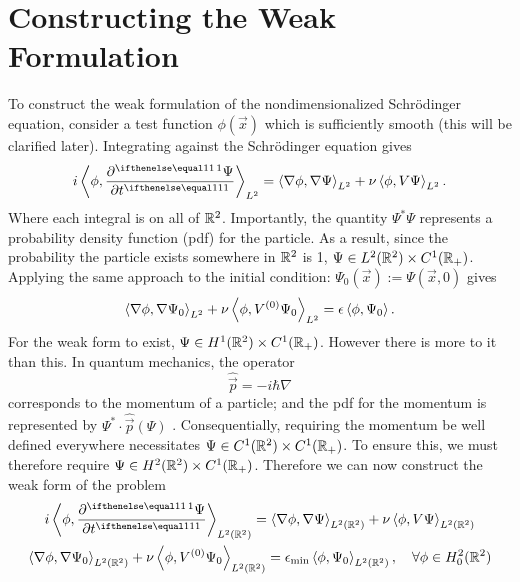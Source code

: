 \documentclass[../../main.tex]{subfiles}
\begin{document}
\section{Constructing the Weak Formulation}

To construct the weak formulation of the nondimensionalized 
Schr\"odinger equation, consider a test function 
$\phi(\vec x)$ which is sufficiently smooth
(this will be clarified later). 
Integrating against the Schr\"odinger equation gives
\[
		i\inner{\phi, \pder{\Psi}{t}}_{L^2} = 
		\inner{\nabla \phi, \nabla \Psi}_{L^2} + 
		\nu \inner{\phi, V \Psi}_{L^2}
.\] 
Where each integral is on all of $\mathbb{R}^2$.  
Importantly, the quantity 
$\Psi^* \Psi$ represents a probability density function (pdf) 
for the particle.  
As a result, since the probability the particle exists somewhere 
in $\mathbb{R}^2$ is 1, $\Psi \in L^2(\mathbb{R}^2) \times C^1(\mathbb{R}_+) $.  
Applying the same approach to the initial condition:
$\Psi_0(\vec x) := \Psi(\vec x, 0)$ gives 
\[
		\left\langle \nabla \phi, \nabla \Psi_0 \right\rangle_{L^2} + 
		\nu \left\langle \phi, V^{(0)} \Psi_0 \right\rangle_{L^2} = 
		\epsilon \left\langle \phi, \Psi_0 \right\rangle
.\] 
For the weak form to exist, 
$\Psi \in H^1(\mathbb{R}^2) \times C^1(\mathbb{R}_+)$.  
However there is more to it than this.  
In quantum mechanics, the operator
\[
		\hat {\vec p} = -i \hbar \nabla
\] 
corresponds to the momentum of a particle;
and the pdf for the momentum is represented by
$\Psi^* \cdot \hat{\vec p}(\Psi)$ \cite{griffiths-quantum}.
Consequentially, requiring the momentum be well defined everywhere
necessitates $\Psi \in C^1(\mathbb{R}^2) \times C^1(\mathbb{R}_+)$.  
To ensure this, we must therefore require 
$\Psi \in H^2(\mathbb{R}^2) \times C^1(\mathbb{R}_+)$.  
Therefore we can now construct the weak form of the problem
\begin{gather}
		i \inner{\phi, \pder{\Psi}{t}}_{L^2(\R^2)} = 
		\inner{\nabla \phi, \nabla \Psi}_{L^2(\R^2)} + 
		\nu \inner{\phi, V\Psi}_{L^2(\R^2)} \\
		\inner{\nabla \phi, \nabla \Psi_0}_{L^2(\R^2)} + 
		\nu \inner{\phi, V^{(0)} \Psi_0}_{L^2(\R^2)} = 
		\epsilon_\mathrm{min} \inner{\phi, \Psi_0}_{L^2(\R^2)}, 
		\quad \forall \phi \in H_0^2(\R^2)
\end{gather}
\end{document}
